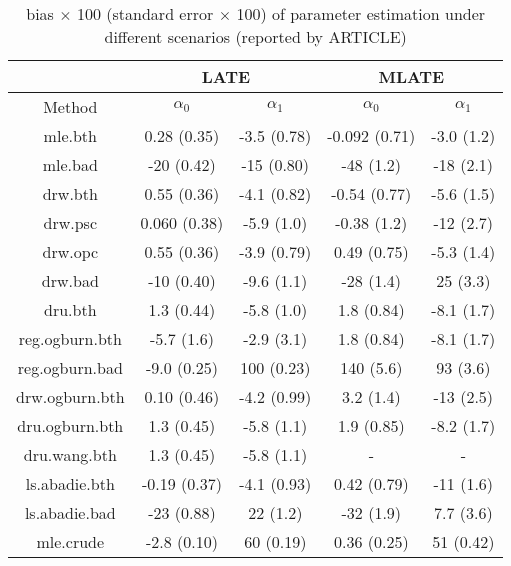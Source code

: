 \documentclass{article}
\begin{document}
\begin{table}
\footnotesize
\centering
\begin{tabular}[h]{c|cc|cc}
\toprule
    & \multicolumn{2}{c|}{LATE} &\multicolumn{2}{c}{MLATE}\\
\midrule
    Method & $\alpha_0$ & $\alpha_1$ & $\alpha_0$ & $\alpha_1$\\
\midrule
    mle.bth&0.28 (0.35) & -3.5 (0.78)&-0.092 (0.71) &-3.0 (1.2)\\
    mle.bad&-20 (0.42) & -15 (0.80)&-48 (1.2) & -18 (2.1)\\
    drw.bth&0.55 (0.36) & -4.1 (0.82)&-0.54 (0.77) & -5.6 (1.5)\\
    drw.psc&0.060 (0.38) & -5.9 (1.0)&-0.38 (1.2) & -12 (2.7)\\
    drw.opc&0.55 (0.36) & -3.9 (0.79)&0.49 (0.75) & -5.3 (1.4)\\
    drw.bad&-10 (0.40) & -9.6 (1.1)&-28 (1.4) & 25 (3.3)\\
    dru.bth&1.3 (0.44) & -5.8 (1.0)&1.8 (0.84) & -8.1 (1.7)\\
    reg.ogburn.bth&-5.7 (1.6) & -2.9 (3.1)&1.8 (0.84) & -8.1 (1.7)\\
    reg.ogburn.bad&-9.0 (0.25) & 100 (0.23)&140 (5.6) & 93 (3.6)\\
    drw.ogburn.bth&0.10 (0.46) & -4.2 (0.99)&3.2 (1.4) & -13 (2.5)\\
    dru.ogburn.bth&1.3 (0.45) & -5.8 (1.1)&1.9 (0.85) & -8.2 (1.7)\\
    dru.wang.bth&1.3 (0.45) & -5.8 (1.1)&- & -\\
    ls.abadie.bth&-0.19 (0.37) & -4.1 (0.93)&0.42 (0.79) & -11 (1.6)\\
    ls.abadie.bad&-23 (0.88) & 22 (1.2)&-32 (1.9) & 7.7 (3.6)\\
    mle.crude&-2.8 (0.10) &60 (0.19)&0.36 (0.25) & 51 (0.42)\\
\bottomrule
\end{tabular}
\caption{bias $\times$ 100 (standard error $\times$ 100) of parameter estimation under different scenarios (reported by ARTICLE)}
\label{theirbias}
\end{table}
\end{document}
